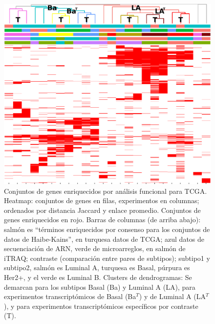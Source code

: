 \documentclass[12pt,twoside]{reedthesis}
\begin{document}
\begin{figure}

{\centering \includegraphics[width=1\linewidth]{images/MIGSA_FIG3} 

}

\caption{Conjuntos de genes enriquecidos por análisis funcional para TCGA. Heatmap: conjuntos de genes en filas, experimentos en columnas; ordenados por distancia Jaccard y enlace promedio. Conjuntos de genes enriquecidos en rojo. Barras de columnas (de arriba abajo): salmón es ``términos enriquecidos por consenso para los conjuntos de datos de Haibe-Kains'', en turquesa datos de TCGA; azul datos de secuenciación de ARN, verde de microarreglos, en salmón de iTRAQ; contraste (comparación entre pares de subtipos); subtipo1 y subtipo2, salmón es Luminal A, turquesa es Basal, púrpura es Her2+, y el verde es Luminal B. Clusters de dendrogramas: Se demarcan para los subtipos Basal (Ba) y Luminal A (LA), para experimentos transcriptómicos de Basal (Ba\(^T\)) y de Luminal A (LA\(^T\)), y para experimentos transcriptómicos específicos por contraste (T).}\label{fig:migsa3}
\end{figure}
\end{document}
